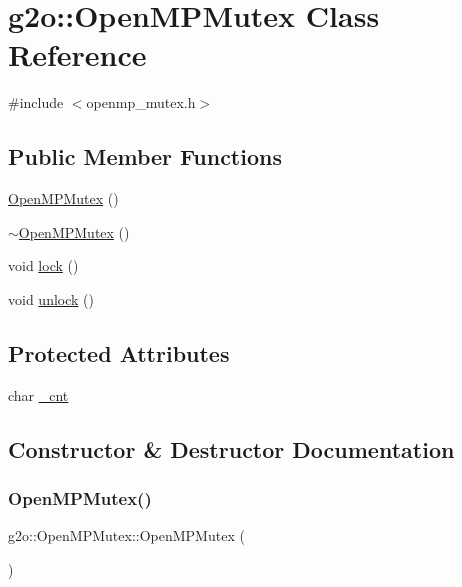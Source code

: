 \hypertarget{classg2o_1_1_open_m_p_mutex}{}\section{g2o\+:\+:Open\+M\+P\+Mutex Class Reference}
\label{classg2o_1_1_open_m_p_mutex}


{\ttfamily \#include $<$openmp\+\_\+mutex.\+h$>$}

\subsection*{Public Member Functions}
\begin{DoxyCompactItemize}
\item 
\mbox{\hyperlink{classg2o_1_1_open_m_p_mutex_a6da42eedf0311e2fea758220a8ec687a}{Open\+M\+P\+Mutex}} ()
\item 
\mbox{\hyperlink{classg2o_1_1_open_m_p_mutex_a9b69c2121719115dd6c70738eccf5c1f}{$\sim$\+Open\+M\+P\+Mutex}} ()
\item 
void \mbox{\hyperlink{classg2o_1_1_open_m_p_mutex_aa79e59ebdd67ba8c2bac379a98dc6855}{lock}} ()
\item 
void \mbox{\hyperlink{classg2o_1_1_open_m_p_mutex_a63ec384d3012af5c42fe379df2e3901a}{unlock}} ()
\end{DoxyCompactItemize}
\subsection*{Protected Attributes}
\begin{DoxyCompactItemize}
\item 
char \mbox{\hyperlink{classg2o_1_1_open_m_p_mutex_a0cb363393694ee0dd15f822fbda7645a}{\+\_\+cnt}}
\end{DoxyCompactItemize}


\subsection{Constructor \& Destructor Documentation}
\mbox{\label{classg2o_1_1_open_m_p_mutex_a6da42eedf0311e2fea758220a8ec687a}} 
\subsubsection{\texorpdfstring{Open\+M\+P\+Mutex()}{OpenMPMutex()}}
{\footnotesize\ttfamily g2o\+::\+Open\+M\+P\+Mutex\+::\+Open\+M\+P\+Mutex (\begin{DoxyParamCaption}{ }\end{DoxyParamCaption})\hspace{0.3cm}{\ttfamily [inline]}}

